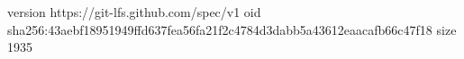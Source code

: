 version https://git-lfs.github.com/spec/v1
oid sha256:43aebf18951949ffd637fea56fa21f2c4784d3dabb5a43612eaacafb66c47f18
size 1935
